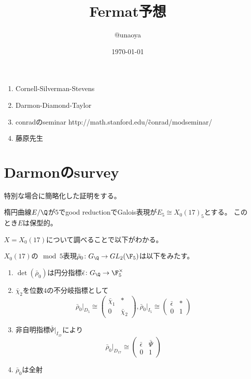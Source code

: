 \documentclass{jsarticle}
\title{Fermat予想}
\author{@unaoya}
\date{\today}
\begin{document}
\maketitle
\begin{enumerate}
\item Cornell-Silverman-Stevens
\item Darmon-Diamond-Taylor
\item conradのseminar http://math.stanford.edu/\~conrad/modseminar/
\item 藤原先生
\end{enumerate}

\section{Darmonのsurvey}
特別な場合に簡略化した証明をする。
\begin{thm}
楕円曲線$E/\Q$が$5$でgood reductionでGalois表現が$E_5\cong X_0(17)_5$とする。
このとき$E$は保型的。
\end{thm}

$X=X_0(17)$について調べることで以下がわかる。
\begin{lem}
$X_0(17)$の$\mod 5$表現$\bar{\rho}_0\colon G_\Q\to GL_2(\F_5)$は以下をみたす。
\begin{enumerate}
\item $\det(\bar{\rho}_0)$は円分指標$\bar{\epsilon}\colon G_\Q\to \F_5^\times$
\item $\bar{\chi}_2$を位数$4$の不分岐指標として
\[
\bar{\rho}_0\vert_{D_5}\cong\begin{pmatrix}\bar{\chi}_1&*\\0&\bar{\chi}_2\end{pmatrix},
\bar{\rho}_0\vert_{I_5}\cong\begin{pmatrix}\bar{\epsilon}&*\\0&1\end{pmatrix}
\]
\item 非自明指標$\bar{\Psi}\vert_{I_{17}}$により
\[
\bar{\rho}_0\vert_{D_{17}}\cong\begin{pmatrix}\bar{\epsilon}&\bar{\Psi}\\0&1\end{pmatrix}
\]
\item $\bar{\rho}_0$は全射
\end{enumerate}
\end{lem}
\end{document}
